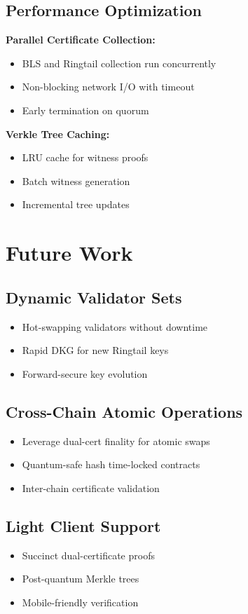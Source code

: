 \documentclass[11pt]{article}
\begin{document}
\subsection{Performance Optimization}

\textbf{Parallel Certificate Collection:}
\begin{itemize}
\item BLS and Ringtail collection run concurrently
\item Non-blocking network I/O with timeout
\item Early termination on quorum
\end{itemize}

\textbf{Verkle Tree Caching:}
\begin{itemize}
\item LRU cache for witness proofs
\item Batch witness generation
\item Incremental tree updates
\end{itemize}

\section{Future Work}

\subsection{Dynamic Validator Sets}
\begin{itemize}
\item Hot-swapping validators without downtime
\item Rapid DKG for new Ringtail keys
\item Forward-secure key evolution
\end{itemize}

\subsection{Cross-Chain Atomic Operations}
\begin{itemize}
\item Leverage dual-cert finality for atomic swaps
\item Quantum-safe hash time-locked contracts
\item Inter-chain certificate validation
\end{itemize}

\subsection{Light Client Support}
\begin{itemize}
\item Succinct dual-certificate proofs
\item Post-quantum Merkle trees
\item Mobile-friendly verification
\end{itemize}
\end{document}
